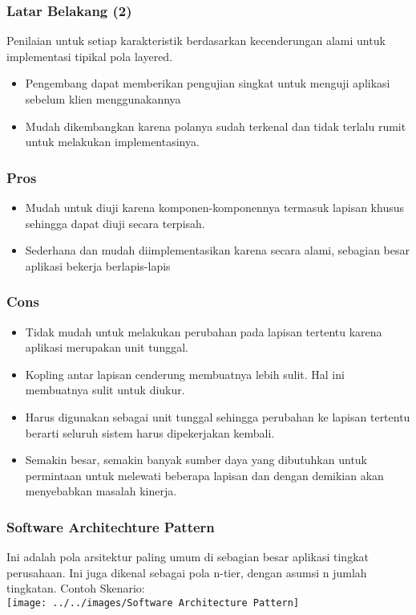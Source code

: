 \documentclass[aspectratio=169, table]{beamer}
\begin{document}
		\begin{frame}
		\frametitle{Latar Belakang (2)}
		Penilaian untuk setiap karakteristik berdasarkan kecenderungan alami untuk implementasi tipikal pola layered.
		\begin{itemize}
		
			\item Pengembang dapat memberikan pengujian singkat untuk menguji aplikasi sebelum klien menggunakannya
			\item Mudah dikembangkan karena polanya sudah terkenal dan tidak terlalu rumit untuk melakukan implementasinya.
		\end{itemize}
	\end{frame}
	
	
	\begin{frame}
		\frametitle{Pros}
		\begin{itemize}
			\item Mudah untuk diuji karena komponen-komponennya termasuk lapisan khusus sehingga dapat diuji secara terpisah.
			\item Sederhana dan mudah diimplementasikan karena secara alami, sebagian besar aplikasi bekerja berlapis-lapis
		\end{itemize}
	\end{frame}
	
	\begin{frame}
		\frametitle{Cons}
		\begin{itemize}
			\item Tidak mudah untuk melakukan perubahan pada lapisan tertentu karena aplikasi merupakan unit tunggal.
			\item Kopling antar lapisan cenderung membuatnya lebih sulit. Hal ini membuatnya sulit untuk diukur.
			\item Harus digunakan sebagai unit tunggal sehingga perubahan ke lapisan tertentu berarti seluruh sistem harus dipekerjakan kembali.
			\item Semakin besar, semakin banyak sumber daya yang dibutuhkan untuk permintaan untuk melewati beberapa lapisan dan dengan demikian akan menyebabkan masalah kinerja.
		\end{itemize}
	\end{frame}
	
	\begin{frame}
		\frametitle{Software Architechture Pattern}
		Ini adalah pola arsitektur paling umum di sebagian besar aplikasi tingkat perusahaan. Ini juga dikenal sebagai pola n-tier, dengan asumsi n jumlah tingkatan. Contoh Skenario: \\
		\texttt{[image: ../../images/Software Architecture Pattern]}
	\end{frame}
	
\end{document}
